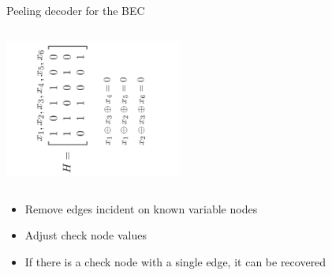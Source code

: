 \documentclass[10pt,xcolor=table]{beamer}
\begin{document}
\begin{frame}{Peeling decoder for the BEC}
\vspace{-0.3in}
\begin{columns}
\begin{column}{0.5\textwidth}
\includegraphics[width=2.3in,angle=-90]{./Figures/paritycheckmatrix63code}
\end{column}

\begin{column}{0.5\textwidth}
\scalebox{1}{}
\end{column}
\end{columns}

\begin{block}{}
\begin{itemize}
  \item Remove edges incident on known variable nodes
  \item Adjust check node values
  \item If there is a check node with a single edge, it can be recovered
\end{itemize}
\end{block}
\end{frame}
\end{document}
